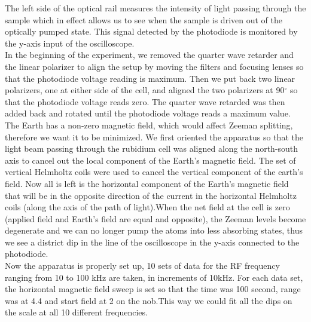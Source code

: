 \documentclass[prb,preprint]{revtex4-1}
\begin{document}
The left side of the optical rail measures the intensity of light passing through the sample which in effect allows us to see when the sample is driven out of the optically pumped state. This signal detected by the photodiode is monitored by the y-axis input of the oscilloscope. \\

In the beginning of the experiment, we removed the quarter wave retarder and the linear polarizer to align the setup by moving the filters and focusing lenses so that the photodiode voltage reading is maximum. Then we put back two linear polarizers, one at either side of the cell, and aligned the two polarizers at 90$^{\circ}$ so that the photodiode voltage reads zero. The quarter wave retarded was then added back and rotated until the photodiode voltage reads a maximum value.\\


The Earth has a non-zero magnetic field, which would affect Zeeman splitting, therefore we want it to be minimized. We first oriented the apparatus so that the light beam passing through the rubidium cell was aligned along the north-south axis to cancel out the local component of the Earth's magnetic field. The set of vertical Helmholtz coils were used to cancel the vertical component of the earth's field. Now all is left is the horizontal component of the Earth's magnetic field that will be in the opposite direction of the current in the horizontal Helmholtz coils (along the axis of the path of light).When the net field at the cell is zero (applied field and Earth's field are equal and opposite), the Zeeman levels become degenerate and we can no longer pump the atoms into less absorbing states, thus we see a district dip in the line of the oscilloscope in the y-axis connected to the photodiode.\\

Now the apparatus is properly set up, 10 sets of data for the RF frequency ranging from 10 to 100 kHz are taken, in increments of 10kHz. For each data set, the horizontal magnetic field sweep is set so that the time was 100 second, range was at 4.4 and start field at 2 on the nob.This way we could fit all the dips on the scale at all 10 different frequencies.\\
\end{document}
